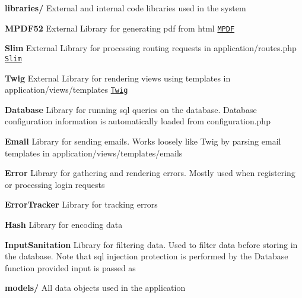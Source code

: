 \begin{DoxyItemize}
\begin{DoxyItemize}
\item {\bfseries libraries/} External and internal code libraries used in the system


\begin{DoxyItemize}
\item {\bfseries M\-P\-D\-F52} External Library for generating pdf from html \href{http://www.mpdf1.com/mpdf/index.php}{\tt M\-P\-D\-F}
\item {\bfseries Slim} External Library for processing routing requests in application/routes.\-php \href{http://www.slimframework.com/}{\tt Slim}
\item {\bfseries Twig} External Library for rendering views using templates in application/views/templates \href{twig.sensiolabs.org}{\tt Twig}
\end{DoxyItemize}


\begin{DoxyItemize}
\item {\bfseries Database} Library for running sql queries on the database. Database configuration information is automatically loaded from configuration.\-php
\item {\bfseries Email} Library for sending emails. Works loosely like Twig by parsing email templates in application/views/templates/emails
\item {\bfseries Error} Library for gathering and rendering errors. Mostly used when registering or processing login requests
\item {\bfseries Error\-Tracker} Library for tracking errors
\item {\bfseries Hash} Library for encoding data
\item {\bfseries Input\-Sanitation} Library for filtering data. Used to filter data before storing in the database. Note that sql injection protection is performed by the Database function provided input is passed as
\end{DoxyItemize}
\end{DoxyItemize}


\begin{DoxyItemize}
\item {\bfseries models/} All data objects used in the application



\end{DoxyItemize}
\end{DoxyItemize}
